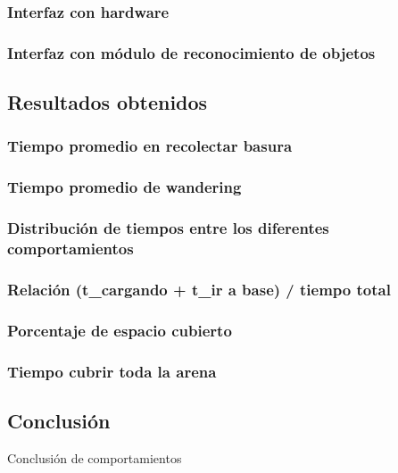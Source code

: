 \subsubsection{Interfaz con hardware}

\subsubsection{Interfaz con m\'odulo de reconocimiento de objetos}

\newpage
\subsection{Resultados obtenidos}
\label{results}

\subsubsection{Tiempo promedio en recolectar basura}

\subsubsection{Tiempo promedio de wandering}

\subsubsection{Distribuci\'on de tiempos entre los diferentes comportamientos}

\subsubsection{Relaci\'on (t\_cargando + t\_ir a base) / tiempo total}

\subsubsection{Porcentaje de espacio cubierto}

\subsubsection{Tiempo cubrir toda la arena}

\newpage
\subsection{Conclusi\'on}
\label{comp_conclusion}
Conclusi\'on de comportamientos

